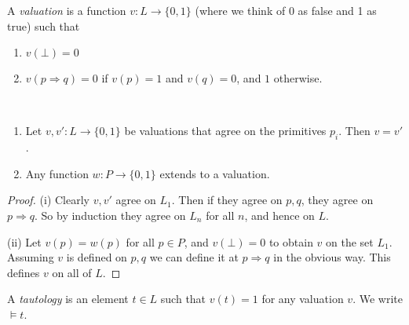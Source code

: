 \documentclass[a3paper, 10pt]{article}
\newcommand{\enumpre}{}
\renewcommand{\vocab}[1]{\emph{#1}}
\begin{document}
\begin{multicols*}{5}
\begin{definition}[Valuation]
  A \vocab{valuation} is a function $v : L \rightarrow \{0, 1\}$ (where we think of $0$ as false and 1 as true) such that
  \begin{enumerate}
    \item $v(\bot) = 0$
    \item $v(p \Rightarrow q) = 0$ if $v(p) = 1$ and $v(q) = 0$, and $1$ otherwise.
  \end{enumerate}
\end{definition}


\begin{proposition}~
  \enumpre
  \begin{enumerate}[label=(\roman*)]
    \item Let $v, v' : L \rightarrow \{0, 1\}$ be valuations that agree on the primitives $p_i$. Then $v = v'$.
    \item Any function $w: P \rightarrow \{0, 1\}$ extends to a valuation.
  \end{enumerate}
\end{proposition}
    
\begin{proof}(i) Clearly $v, v'$ agree on $L_1$. Then if they agree on $p, q$, they agree on $p \Rightarrow q$. So by induction they agree on $L_n$ for all $n$, and hence on $L$.

  (ii) Let $v(p) = w(p)$ for all $p \in P$, and $v(\bot) = 0$ to obtain $v$ on the set $L_1$. Assuming $v$ is defined on $p, q$ we can define it at $p\Rightarrow q$ in the obvious way. This defines $v$ on all of $L$.
\end{proof}

\begin{definition}[Tautology]
  A \vocab{tautology} is an element $t \in L$ such that $v(t) = 1$ for any valuation $v$. We write $\models t$.
\end{definition}


\end{multicols*}
\end{document}
